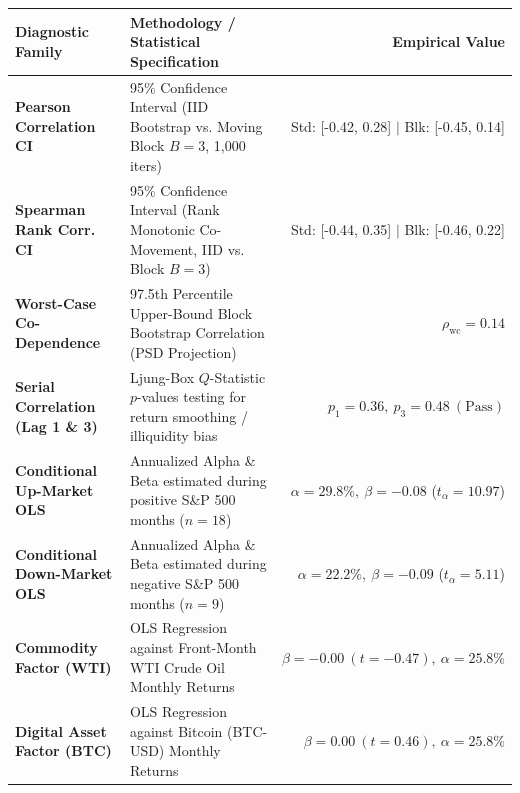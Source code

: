 \documentclass[10pt,a4paper]{article}
\begin{document}
\vspace{0.3em}
\noindent{\color{goldaccent}\rule{\textwidth}{1.2pt}}
\vspace{0.5em}

\begin{tcolorbox}[colback=white, colframe=primary, title=\textbf{\small\strut Appendix A: Extended Statistical, Bootstrap \& Factor Diagnostics}, fonttitle=\sffamily\bfseries\small, arc=5pt, boxrule=0.8pt, toptitle=4pt, bottomtitle=4pt, left=6pt, right=6pt, top=4pt, bottom=4pt, colbacktitle=primary]
\renewcommand{\arraystretch}{1.25}
\scriptsize
\begin{tabularx}{\textwidth}{l X r}
\toprule
\textbf{\textcolor{primary}{Diagnostic Family}} & \textbf{\textcolor{primary}{Methodology / Statistical Specification}} & \textbf{\textcolor{primary}{Empirical Value}} \\
\midrule
\textbf{Pearson Correlation CI} & 95\% Confidence Interval (IID Bootstrap vs. Moving Block $B=3$, 1,000 iters) & Std: [-0.42, 0.28] $\vert$ Blk: [-0.45, 0.14] \\
\rowcolor{cardbg} \textbf{Spearman Rank Corr. CI} & 95\% Confidence Interval (Rank Monotonic Co-Movement, IID vs. Block $B=3$) & Std: [-0.44, 0.35] $\vert$ Blk: [-0.46, 0.22] \\
\textbf{Worst-Case Co-Dependence} & 97.5th Percentile Upper-Bound Block Bootstrap Correlation (PSD Projection) & $\rho_{\text{wc}} = 0.14$ \\
\rowcolor{cardbg} \textbf{Serial Correlation (Lag 1 \& 3)} & Ljung-Box $Q$-Statistic $p$-values testing for return smoothing / illiquidity bias & $p_1=0.36,\ p_3=0.48\ (\text{Pass})$ \\
\textbf{Conditional Up-Market OLS} & Annualized Alpha \& Beta estimated during positive S\&P 500 months ($n=18$) & $\alpha=29.8\%,\ \beta=-0.08$ ($t_\alpha=10.97$) \\
\rowcolor{cardbg} \textbf{Conditional Down-Market OLS} & Annualized Alpha \& Beta estimated during negative S\&P 500 months ($n=9$) & $\alpha=22.2\%,\ \beta=-0.09$ ($t_\alpha=5.11$) \\
\textbf{Commodity Factor (WTI)} & OLS Regression against Front-Month WTI Crude Oil Monthly Returns & $\beta=-0.00\ (t=-0.47),\ \alpha=25.8\%$ \\
\rowcolor{cardbg} \textbf{Digital Asset Factor (BTC)} & OLS Regression against Bitcoin (BTC-USD) Monthly Returns & $\beta=0.00\ (t=0.46),\ \alpha=25.8\%$ \\
\bottomrule
\end{tabularx}
\end{tcolorbox}
\end{document}
